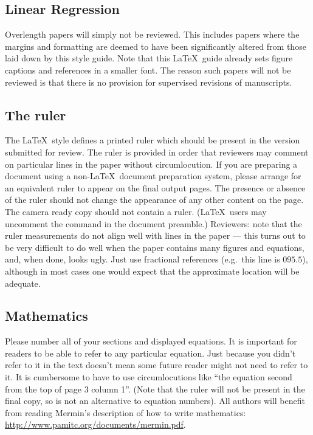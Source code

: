 \documentclass[10pt,twocolumn,letterpaper]{article}
\begin{document}
\subsection{Linear Regression}
Overlength papers will simply not be reviewed.  This includes papers
where the margins and formatting are deemed to have been significantly
altered from those laid down by this style guide.  Note that this
\LaTeX\ guide already sets figure captions and references in a smaller font.
The reason such papers will not be reviewed is that there is no provision for
supervised revisions of manuscripts.  

\subsection{The ruler}
The \LaTeX\ style defines a printed ruler which should be present in the
version submitted for review.  The ruler is provided in order that
reviewers may comment on particular lines in the paper without
circumlocution.  If you are preparing a document using a non-\LaTeX\
document preparation system, please arrange for an equivalent ruler to
appear on the final output pages.  The presence or absence of the ruler
should not change the appearance of any other content on the page.  The
camera ready copy should not contain a ruler. (\LaTeX\ users may uncomment
the command in the document preamble.)  Reviewers:
note that the ruler measurements do not align well with lines in the paper
--- this turns out to be very difficult to do well when the paper contains
many figures and equations, and, when done, looks ugly.  Just use fractional
references (e.g.\ this line is $095.5$), although in most cases one would
expect that the approximate location will be adequate.

\subsection{Mathematics}

Please number all of your sections and displayed equations.  It is
important for readers to be able to refer to any particular equation.  Just
because you didn't refer to it in the text doesn't mean some future reader
might not need to refer to it.  It is cumbersome to have to use
circumlocutions like ``the equation second from the top of page 3 column
1''.  (Note that the ruler will not be present in the final copy, so is not
an alternative to equation numbers).  All authors will benefit from reading
Mermin's description of how to write mathematics:
\url{http://www.pamitc.org/documents/mermin.pdf}.
\end{document}

